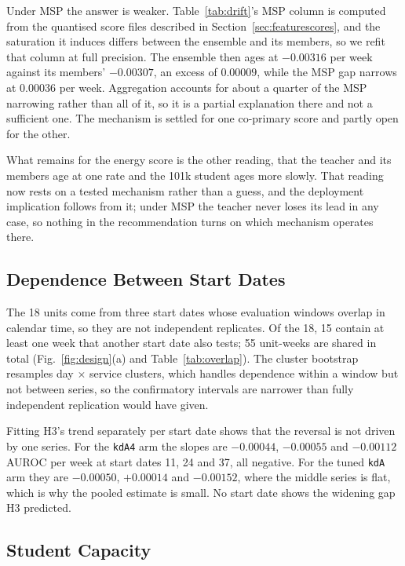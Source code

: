 \documentclass[journal]{IEEEtran}
\newcommand{\kd}[1]{\texttt{#1}}
\begin{document}
Under MSP the answer is weaker. Table~\ref{tab:drift}'s MSP column is computed from the quantised score files described in Section~\ref{sec:featurescores}, and the saturation it induces differs between the ensemble and its members, so we refit that column at full precision. The ensemble then ages at $-0.00316$ per week against its members' $-0.00307$, an excess of $0.00009$, while the MSP gap narrows at $0.00036$ per week. Aggregation accounts for about a quarter of the MSP narrowing rather than all of it, so it is a partial explanation there and not a sufficient one. The mechanism is settled for one co-primary score and partly open for the other.

What remains for the energy score is the other reading, that the teacher and its members age at one rate and the 101k student ages more slowly. That reading now rests on a tested mechanism rather than a guess, and the deployment implication follows from it; under MSP the teacher never loses its lead in any case, so nothing in the recommendation turns on which mechanism operates there.

\subsection{Dependence Between Start Dates}
\label{sec:overlap}

The 18 units come from three start dates whose evaluation windows overlap in calendar time, so they are not independent replicates. Of the 18, 15 contain at least one week that another start date also tests; 55 unit-weeks are shared in total (Fig.~\ref{fig:design}(a) and Table~\ref{tab:overlap}). The cluster bootstrap resamples day $\times$ service clusters, which handles dependence within a window but not between series, so the confirmatory intervals are narrower than fully independent replication would have given.

Fitting H3's trend separately per start date shows that the reversal is not driven by one series. For the \kd{kdA4} arm the slopes are $-0.00044$, $-0.00055$ and $-0.00112$ AUROC per week at start dates 11, 24 and 37, all negative. For the tuned \kd{kdA} arm they are $-0.00050$, $+0.00014$ and $-0.00152$, where the middle series is flat, which is why the pooled estimate is small. No start date shows the widening gap H3 predicted.

\subsection{Student Capacity}
\label{sec:capacity}
\end{document}
